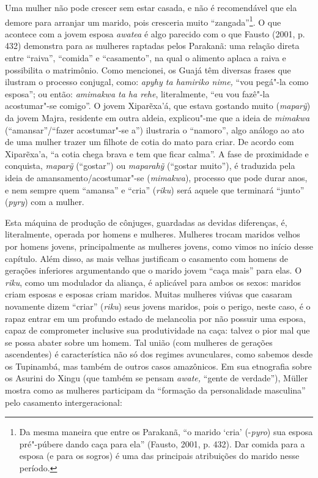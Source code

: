 Uma mulher não pode crescer sem estar casada, e não é recomendável que
ela demore para arranjar um marido, pois cresceria muito
``zangada''\footnote{Da mesma maneira que entre os Parakanã, ``o marido
  `cria' (-\emph{pyro}) sua esposa pré"-púbere dando caça para ela''
  (Fausto, 2001, p. 432). Dar comida para a esposa (e para os sogros) é uma
  das principais atribuições do marido nesse período.}. O que acontece
com a jovem esposa \emph{awatea} é algo parecido com o que Fausto
(2001, p. 432) demonstra para as mulheres raptadas pelos Parakanã: uma
relação direta entre ``raiva'', ``comida'' e ``casamento'', na qual o
alimento aplaca a raiva e possibilita o matrimônio. Como mencionei, os
Guajá têm diversas frases que ilustram o processo conjugal, como:
\emph{apyhy ta hamiriko nime,} ``vou pegá"-la como esposa''; ou então:
\emph{amimakwa ta ha rehe}, literalmente, ``eu vou fazê"-la acostumar"-se
comigo''. O jovem Xiparẽxa'á, que estava gostando muito (\emph{maparỹ})
da jovem Majra, residente em outra aldeia, explicou"-me que a ideia de
\emph{mimakwa} (``amansar''/``fazer acostumar"-se a'') ilustraria o
``namoro'', algo análogo ao ato de uma mulher trazer um filhote de cotia
do mato para criar. De acordo com Xiparẽxa'a, ``a cotia chega brava e tem
que ficar calma''. A fase de proximidade e conquista, \emph{maparỹ}
(``gostar'') ou \emph{maparahỹ} (``gostar muito''), é traduzida pela ideia
de amansamento/acostumar"-se (\emph{mimakwa}), processo que pode durar
anos, e nem sempre quem ``amansa'' e ``cria'' (\emph{riku}) será aquele que
terminará ``junto'' (\emph{pyry}) com a mulher.

Esta máquina de produção de cônjuges, guardadas as devidas diferenças,
é, literalmente, operada por homens e mulheres. Mulheres trocam maridos
velhos por homens jovens, principalmente as mulheres jovens, como vimos
no início desse capítulo. Além disso, as mais velhas justificam o
casamento com homens de gerações inferiores argumentando que o marido
jovem ``caça mais'' para elas. O \emph{riku}, como um modulador da
aliança, é aplicável para ambos os sexos: maridos criam esposas e
esposas criam maridos. Muitas mulheres viúvas que casaram novamente
dizem ``criar'' (\emph{riku}) seus jovens maridos, pois o perigo, neste
caso, é o rapaz entrar em um profundo estado de melancolia por não
possuir uma esposa, capaz de comprometer inclusive sua produtividade na
caça: talvez o pior mal que se possa abater sobre um homem. Tal união
(com mulheres de gerações ascendentes) é característica não só dos
regimes avunculares, como sabemos desde os Tupinambá, mas também de
outros casos amazônicos. Em sua etnografia sobre os Asurini do Xingu
(que também se pensam \emph{awate,} ``gente de verdade''), Müller mostra
como as mulheres participam da ``formação da personalidade masculina''
pelo casamento intergeracional:

